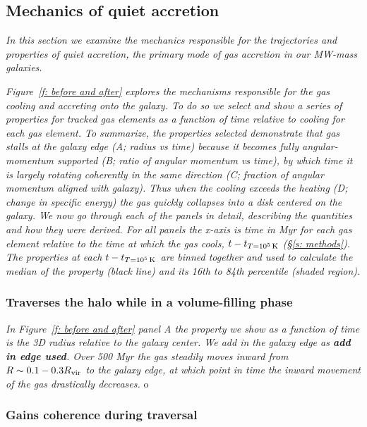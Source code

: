 \documentclass[fleqn,usenatbib]{mnras}
\newcommand{\tcon}{t_{T=10^5\,{\rm K}}}
\begin{document}
\subsection{Mechanics of quiet accretion}
\label{s: mechanics}

\textit{
In this section we examine the mechanics responsible for the trajectories and properties of quiet accretion, the primary mode of gas accretion in our MW-mass galaxies.
}

\textit{
Figure~\ref{f: before and after} explores the mechanisms responsible for the gas cooling and accreting onto the galaxy.
To do so we select and show a series of properties for tracked gas elements as a function of time relative to cooling for each gas element.
To summarize, the properties selected demonstrate that gas stalls at the galaxy edge (A; radius vs time) because it becomes fully angular-momentum supported (B; ratio of angular momentum vs time), by which time it is largely rotating coherently in the same direction (C; fraction of angular momentum aligned with galaxy).
Thus when the cooling exceeds the heating (D; change in specific energy) the gas quickly collapses into a disk centered on the galaxy.
We now go through each of the panels in detail, describing the quantities and how they were derived.
For all panels the x-axis is time in Myr for each gas element relative to the time at which the gas cools, $t - \tcon$ (\S\ref{s: methods}).
The properties at each $t - \tcon$ are binned together and used to calculate the median of the property (black line) and its 16th to 84th percentile (shaded region).
}

\subsubsection{Traverses the halo while in a volume-filling phase}

\textit{
In Figure~\ref{f: before and after} panel A the property we show as a function of time is the 3D radius relative to the galaxy center.
We add in the galaxy edge as \textbf{add in edge used}.
Over 500 Myr the gas steadily moves inward from $ R\sim 0.1 - 0.3 R_{\rm vir}$ to the galaxy edge, at which point in time the inward movement of the gas drastically decreases.
}o

\subsubsection{Gains coherence during traversal}
\end{document}
